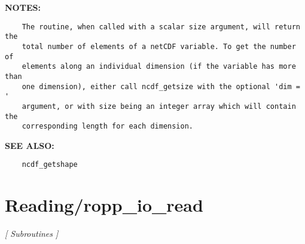 \textbf{NOTES:}\hspace{0.08in}\begin{Verbatim}
    The routine, when called with a scalar size argument, will return the
    total number of elements of a netCDF variable. To get the number of
    elements along an individual dimension (if the variable has more than
    one dimension), either call ncdf_getsize with the optional 'dim = '
    argument, or with size being an integer array which will contain the
    corresponding length for each dimension.
\end{Verbatim}
\textbf{SEE ALSO:}\hspace{0.08in}\begin{Verbatim}
    ncdf_getshape
\end{Verbatim}
\section{Reading/ropp\_io\_read}
\textsl{[ Subroutines ]}

